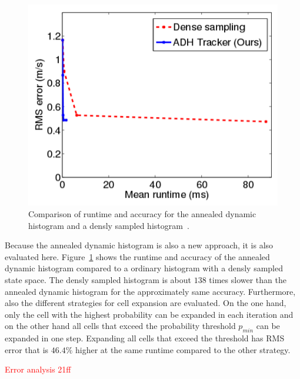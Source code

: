 \documentclass[twoside,a4paper,article]{combine}
\begin{document}
\begin{figure}
  \center
  \includegraphics[width=.5\linewidth]{adh-dense-time}
  \caption{Comparison of runtime and accuracy for the annealed dynamic
    histogram and a densly sampled histogram~\cite{paper}.}
  \label{fig:adh-vs-dense}
\end{figure}

Because the annealed dynamic histogram is also a new approach, it is
also evaluated here. Figure~\ref{fig:adh-vs-dense} shows the runtime
and accuracy of the annealed dynamic histogram compared to a ordinary
histogram with a densly sampled state space. The densly sampled
histogram is about $138$ times slower than the annealed dynamic
histogram for the approximately same accuracy. Furthermore, also the
different strategies for cell expansion are evaluated. On the one
hand, only the cell with the highest probability can be expanded in
each iteration and on the other hand all cells that exceed the
probability threshold $p_{min}$ can be expanded in one step. Expanding
all cells that exceed the threshold has RMS error that is $46.4\%$
higher at the same runtime compared to the other strategy.

\textcolor{red}{Error analysis 21ff}
\end{document}
